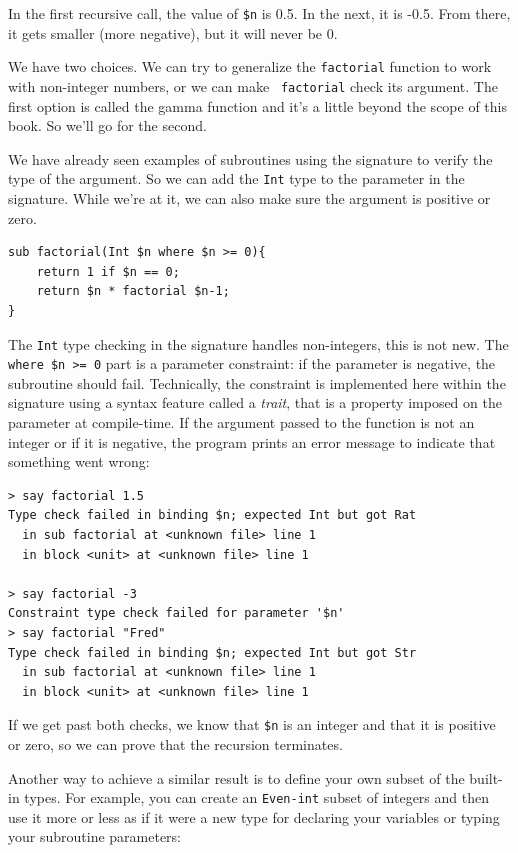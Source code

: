 In the first recursive call, the value of {\tt \$n} is 0.5.
In the next, it is -0.5.  From there, it gets smaller
(more negative), but it will never be 0.

We have two choices.  We can try to generalize the {\tt factorial}
function to work with non-integer numbers, or we can make {\tt 
factorial} check its argument.  The first option is
called the gamma function and it's a
little beyond the scope of this book.  So we'll go for the second.

We have already seen examples of subroutines using the signature 
to verify the type of the argument. So we can add the {\tt Int} 
type to the parameter in the signature. While we're at it, 
we can also make sure the argument is positive or zero.

\begin{verbatim}
sub factorial(Int $n where $n >= 0){
    return 1 if $n == 0;
    return $n * factorial $n-1;
}
\end{verbatim}
%
The {\tt Int} type checking in the signature handles 
non-integers, this is not new. The {\tt where \$n >= 0} 
part is a parameter constraint: if the parameter is negative, 
the subroutine should fail.  Technically, the constraint is 
implemented here within the signature using a syntax feature 
called a \emph{trait}, that is a property imposed on the 
parameter at compile-time. If the argument passed to the 
function is not an integer or if it is negative, the program prints
an error message to indicate that something went wrong:

\begin{verbatim}
> say factorial 1.5
Type check failed in binding $n; expected Int but got Rat
  in sub factorial at <unknown file> line 1
  in block <unit> at <unknown file> line 1

> say factorial -3
Constraint type check failed for parameter '$n'
> say factorial "Fred"
Type check failed in binding $n; expected Int but got Str
  in sub factorial at <unknown file> line 1
  in block <unit> at <unknown file> line 1
\end{verbatim}
% 
If we get past both checks, we know that \verb'$n' is an 
integer and that it is positive or zero, so we can prove 
that the recursion terminates.


Another way to achieve a similar result is to define your own 
subset of the built-in types. For example, you can create an 
{\tt Even-int} subset of integers and then use it more or less 
as if it were a new type for declaring your variables or 
typing your subroutine parameters:


